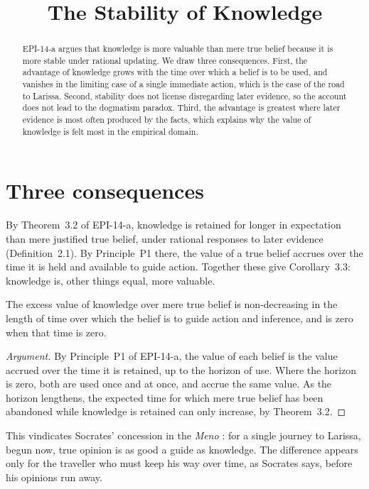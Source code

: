 \documentclass{situationist-preprint}
\title{The Stability of Knowledge}
\begin{document}
\maketitle

\begin{abstract}
EPI-14-a argues that knowledge is more valuable than mere true belief because it is more stable under rational updating. We draw three consequences. First, the advantage of knowledge grows with the time over which a belief is to be used, and vanishes in the limiting case of a single immediate action, which is the case of the road to Larissa. Second, stability does not license disregarding later evidence, so the account does not lead to the dogmatism paradox. Third, the advantage is greatest where later evidence is most often produced by the facts, which explains why the value of knowledge is felt most in the empirical domain.
\end{abstract}

\section{Three consequences}

By Theorem~3.2 of EPI-14-a, knowledge is retained for longer in expectation than mere justified true belief, under rational responses to later evidence (Definition~2.1). By Principle~P1 there, the value of a true belief accrues over the time it is held and available to guide action. Together these give Corollary~3.3: knowledge is, other things equal, more valuable.

\begin{proposition}[Horizon]\label{p:horizon}
The excess value of knowledge over mere true belief is non-decreasing in the length of time over which the belief is to guide action and inference, and is zero when that time is zero.
\end{proposition}

\begin{proof}[Argument]
By Principle~P1 of EPI-14-a, the value of each belief is the value accrued over the time it is retained, up to the horizon of use. Where the horizon is zero, both are used once and at once, and accrue the same value. As the horizon lengthens, the expected time for which mere true belief has been abandoned while knowledge is retained can only increase, by Theorem~3.2.
\end{proof}

This vindicates Socrates' concession in the \emph{Meno} \citep[97a--98a]{Meno}: for a single journey to Larissa, begun now, true opinion is as good a guide as knowledge. The difference appears only for the traveller who must keep his way over time, as Socrates says, before his opinions run away.
\end{document}
